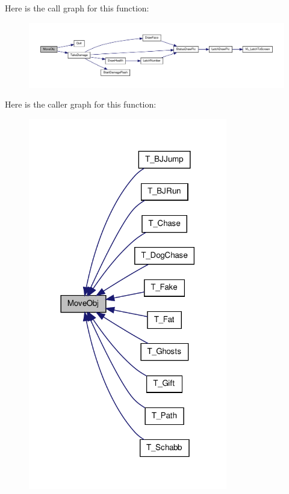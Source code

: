Here is the call graph for this function:
\nopagebreak
\begin{figure}[H]
\begin{center}
\leavevmode
\includegraphics[width=400pt]{WL__STATE_8C_acc590a0c3cb09dd88e7727cbed040ec4_cgraph}
\end{center}
\end{figure}




Here is the caller graph for this function:
\nopagebreak
\begin{figure}[H]
\begin{center}
\leavevmode
\includegraphics[width=246pt]{WL__STATE_8C_acc590a0c3cb09dd88e7727cbed040ec4_icgraph}
\end{center}
\end{figure}


